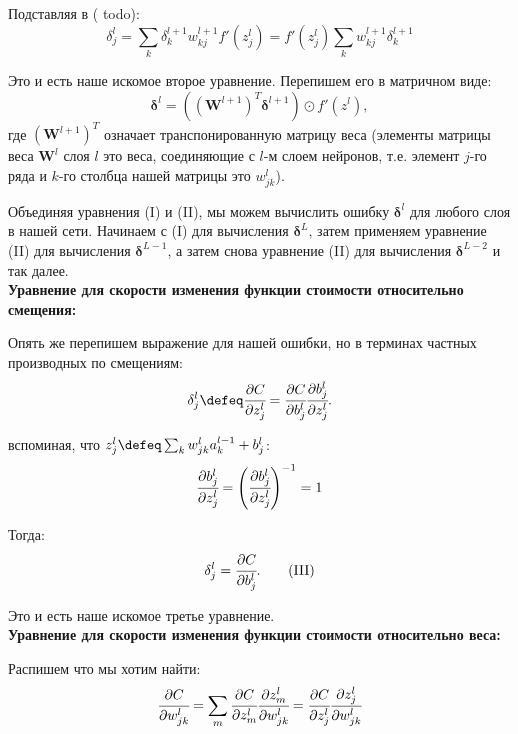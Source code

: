 Подставляя в ({\color{red} todo}):
\begin{equation*}
    \delta_j^l = \sum_k \delta_k^{l+1} w_{kj}^{l+1} f'(z_j^l) = f'(z_j^l) \sum_k w_{kj}^{l+1} \delta_k^{l+1}
\end{equation*}

Это и есть наше искомое второе уравнение. Перепишем его в матричном виде:
\begin{equation*}
    \bm{\delta}^l = ((\bm{W}^{l+1})^T \bm{\delta}^{l+1}) \odot f'(z^l),
    \tag{II}
\end{equation*}
где $(\bm{W}^{l+1})^T$ означает транспонированную матрицу веса 
(элементы матрицы веса $\bm{W}^l$ слоя $l$ это веса, соединяющие с $l$-м слоем нейронов, 
т.е. элемент $j$-го ряда и $k$-го столбца нашей матрицы это $w_{jk}^l$).

Объединяя уравнения (I) и (II), мы можем вычислить ошибку $\bm{\delta}^l$ для любого 
слоя в нашей сети. Начинаем с (I) для вычисления $\bm{\delta}^L$, затем применяем 
уравнение (II) для вычисления $\bm{\delta}^{L-1}$, а затем снова уравнение (II) для 
вычисления $\bm{\delta}^{L-2}$ и так далее.\\

\noindent\textbf{Уравнение для скорости изменения функции стоимости относительно смещения:}

Опять же перепишем выражение для нашей ошибки, но в терминах частных производных 
по смещениям:
\begin{equation*}
    \delta_j^l \defeq \cfrac{\partial C}{\partial z_j^l} = 
    \cfrac{\partial C}{\partial b_j^l} \cfrac{\partial b_j^l}{\partial z_j^l}.
\end{equation*}

вспоминая, что $z_j^l \defeq \sum_k w_{jk}^l a_k^{l-1} + b_j^l$:
\begin{equation*}
    \cfrac{\partial b_j^l}{\partial z_j^l} = 
    \left( \cfrac{\partial b_j^l}{\partial z_j^l} \right)^{-1} = 1
\end{equation*}

Тогда:
\begin{equation*}
    \delta_j^l = \cfrac{\partial C}{\partial b_j^l}.
    \tag{III}
\end{equation*}

Это и есть наше искомое третье уравнение.\\

\noindent\textbf{Уравнение для скорости изменения функции стоимости относительно веса:}

Распишем что мы хотим найти:
\begin{equation}
    \cfrac{\partial C}{\partial w_{jk}^l} = \sum_m \cfrac{\partial C}{\partial z_m^l} \cfrac{\partial z_m^l}{\partial w_{jk}^l} = \cfrac{\partial C}{\partial z_j^l} \cfrac{\partial z_j^l}{\partial w_{jk}^l}
\end{equation}

